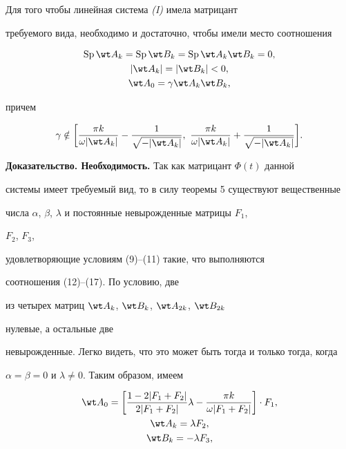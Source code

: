 \begin{thm} 


Для того чтобы линейная система {\em (I)} имела матрицант 


требуемого вида, необходимо и достаточно, чтобы имели место соотношения 


\begin{gather*} 


\SP\wt A_k=\SP\wt B_k=\SP\wt A_k\wt B_k=0,\\ 


|\wt A_k|=|\wt B_k|<0,\\ 


\wt A_0=\gamma\wt A_k\wt B_k, 


\end{gather*} 


причем 


\begin{equation} 


\gamma\notin\bigg[\frac{\pi k}{\omega|\wt A_k|}- 


\frac{1}{\sqrt{-|\wt A_k|}},\ \frac{\pi k}{\omega|\wt A_k|}+ 


\frac{1}{\sqrt{-|\wt A_k|}}\bigg]. 


\end{equation} 


\end{thm} 


 


 


{\bf Доказательство. Необходимость.} Так как матрицант $\Phi(t)$ данной 


системы имеет требуемый вид, то в силу теоремы 5 существуют вещественные 


числа $\alpha$, $\beta$, $\lambda$ и постоянные невырожденные матрицы $F_1$, 


$F_2$, $F_3$, 


удовлетворяющие условиям (9)--(11) такие, что выполняются 


соотношения (12)--(17). По условию, две


из четырех матриц $\wt A_k$, $\wt B_k$, $\wt A_{2k}$, $\wt B_{2k}$


нулевые, а остальные две 


невырожденные. Легко видеть, что это может быть тогда и только тогда, когда 


$\alpha=\beta=0$ и $\lambda\ne0$. Таким образом, имеем 


\begin{gather*} 


\wt A_0=\bigg[\frac{1-2|F_1+F_2|}{2|F_1+F_2|}\lambda- 


\frac{\pi k}{\omega|F_1+F_2|}\bigg]\cdot F_1,\\ 


\wt A_k=\lambda F_2, \\ 


\wt B_k=-\lambda F_3, 


\end{gather*} 


